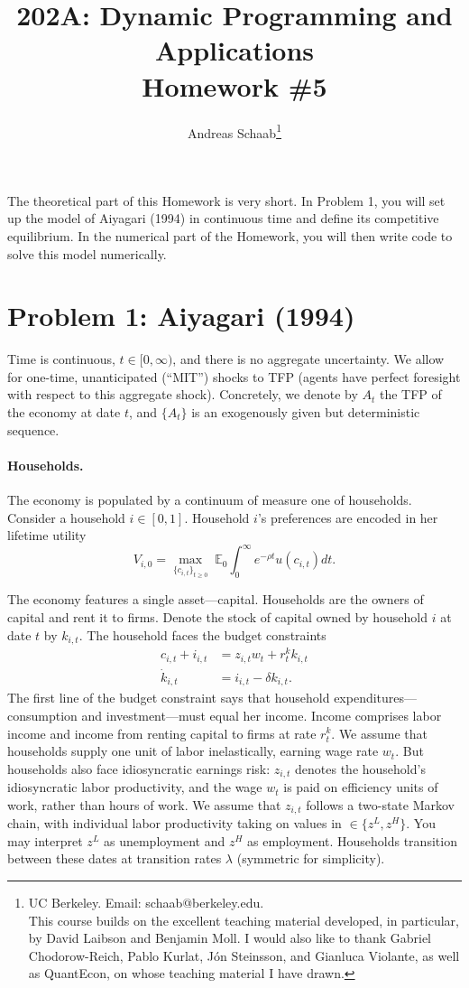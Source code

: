 \documentclass[11pt]{extarticle}
\title{202A: Dynamic Programming and Applications\\[5pt] {\Large \textbf{Homework \#5}}}
\author{Andreas Schaab\footnote{
	UC Berkeley. Email: schaab@berkeley.edu.\\
	This course builds on the excellent teaching material developed, in particular, by David Laibson and Benjamin Moll. I would also like to thank Gabriel Chodorow-Reich, Pablo Kurlat, J\'on Steinsson, and Gianluca Violante, as well as QuantEcon, on whose teaching material I have drawn. 
}}
\date{}
\theoremstyle{plain}
\theoremstyle{definition}
\begin{document}
\maketitle

The theoretical part of this Homework is very short. In Problem 1, you will set up the model of Aiyagari (1994) in continuous time and define its competitive equilibrium. In the numerical part of the Homework, you will then write code to solve this model numerically. 


\section*{Problem 1: Aiyagari (1994)}

Time is continuous, $t \in [0, \infty)$, and there is no aggregate uncertainty. We allow for one-time, unanticipated (``MIT'') shocks to TFP (agents have perfect foresight with respect to this aggregate shock). Concretely, we denote by $A_t$ the TFP of the economy at date $t$, and $\{A_t\}$ is an exogenously given but deterministic sequence. 


\paragraph{Households.}
The economy is populated by a continuum of measure one of households. Consider a household $i \in [0, 1]$. Household $i$'s preferences are encoded in her lifetime utility  
\begin{equation*}
	V_{i, 0} = \max_{ \{c_{i, t}\}_{t \geq 0} } \; \mathbb E_0 \int_0^\infty e^{- \rho t} u(c_{i, t}) dt.
\end{equation*}


The economy features a single asset---capital. Households are the owners of capital and rent it to firms. Denote the stock of capital owned by household $i$ at date $t$ by $k_{i, t}$. The household faces the budget constraints  
\begin{align*}
	c_{i, t} + i_{i, t} &= z_{i, t} w_t + r_t^k k_{i, t} \\
	\dot k_{i, t} &= i_{i, t} - \delta k_{i, t} .
\end{align*}
The first line of the budget constraint says that household expenditures---consumption and investment---must equal her income. Income comprises labor income and income from renting capital to firms at rate $r_t^k$. We assume that households supply one unit of labor inelastically, earning wage rate $w_t$. But households also face idiosyncratic earnings risk: $z_{i, t}$ denotes the household's idiosyncratic labor productivity, and the wage $w_t$ is paid on efficiency units of work, rather than hours of work. We assume that $z_{i, t}$ follows a two-state Markov chain, with individual labor productivity taking on values in $\in  \{z^L, z^H\}$. You may interpret $z^L$ as unemployment and $z^H$ as employment. Households transition between these dates at transition rates $\lambda$ (symmetric for simplicity). 
\end{document}

